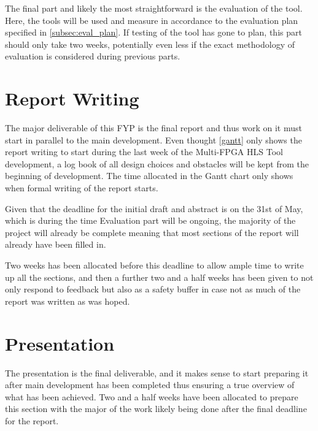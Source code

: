 The final part and likely the most straightforward is the evaluation of the tool. Here, the tools will be used and measure in accordance to the evaluation plan specified in \autoref{subsec:eval_plan}. If testing of the tool has gone to plan, this part should only take two weeks, potentially even less if the exact methodology of evaluation is considered during previous parts.

\section{Report Writing}

The major deliverable of this FYP is the final report and thus work on it must start in parallel to the main development. Even thought \autoref{gantt} only shows the report writing to start during the last week of the Multi-FPGA HLS Tool development, a log book of all design choices and obstacles will be kept from the beginning of development. The time allocated in the Gantt chart only shows when formal writing of the report starts. 

Given that the deadline for the initial draft and abstract is on the 31st of May, which is during the time Evaluation part will be ongoing, the majority of the project will already be complete meaning that most sections of the report will already have been filled in.

Two weeks has been allocated before this deadline to allow ample time to write up all the sections, and then a further two and a half weeks has been given to not only respond to feedback but also as a safety buffer in case not as much of the report was written as was hoped.

\section{Presentation}

The presentation is the final deliverable, and it makes sense to start preparing it after main development has been completed thus ensuring a true overview of what has been achieved. Two and a half weeks have been allocated to prepare this section with the major of the work likely being done after the final deadline for the report.